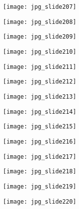 \documentclass[main.tex]{subfiles}
\begin{document}
\begin{center}
\texttt{[image: jpg\_slide207]}
\end{center}

\begin{center}
\texttt{[image: jpg\_slide208]}
\end{center}

\begin{center}
\texttt{[image: jpg\_slide209]}
\end{center}

\begin{center}
\texttt{[image: jpg\_slide210]}
\end{center}

\begin{center}
\texttt{[image: jpg\_slide211]}
\end{center}

\begin{center}
\texttt{[image: jpg\_slide212]}
\end{center}

\begin{center}
\texttt{[image: jpg\_slide213]}
\end{center}

\begin{center}
\texttt{[image: jpg\_slide214]}
\end{center}

\begin{center}
\texttt{[image: jpg\_slide215]}
\end{center}

\begin{center}
\texttt{[image: jpg\_slide216]}
\end{center}

\begin{center}
\texttt{[image: jpg\_slide217]}
\end{center}

\begin{center}
\texttt{[image: jpg\_slide218]}
\end{center}

\begin{center}
\texttt{[image: jpg\_slide219]}
\end{center}

\begin{center}
\texttt{[image: jpg\_slide220]}
\end{center}
\end{document}
